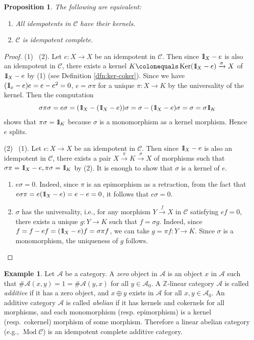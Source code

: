 \documentclass{surv-l}
\numberwithin{equation}{chapter}
\numberwithin{figure}{chapter}
\theoremstyle{plain}
\newtheorem{prp}[thm]{Proposition}
\theoremstyle{definition}
\newtheorem{exm}[thm]{Example}
\theoremstyle{remark}
\newcommand{\id}{1\kern-.25em{\text{{\rm l}}}}
\DeclareMathOperator{\Ker}{Ker}
\DeclareMathOperator{\Mod}{Mod}
\begin{document}
\begin{prp}\label{prp:idemp-compl-kernel}\label{prop:2.5.21}
The following are equivalent:
\begin{enumerate}
\item
All idempotents in ${\mathcal{C}}$ have their kernels.
\item
${\mathcal{C}}$ is idempotent complete.
\end{enumerate}
\end{prp}

\begin{proof}
(1) \text{$\Rightarrow$}\  (2).
Let $e \colon X \to X$ be an idempotent in ${\mathcal{C}}$.
Then since $\id_X - e$ is also an idempotent in ${\mathcal{C}}$,
there exists a kernel $K\colonequals  \Ker (\id_X - e) \xrightarrow{\sigma} X$ of $\id_X - e$
by (1) (see Definition \ref{dfn:ker-coker}).
Since we have
$(\id_x - e)e = e - e^2 = 0$,
$e = \sigma \pi$ for a unique $\pi \colon X \to K$
by the universality of the kernel.
Then the computation
\[
\sigma \pi \sigma = e \sigma = (\id_X - (\id_X-e))\sigma = \sigma - (\id_X- e)\sigma = \sigma = \sigma\id_K
\]
shows that $\pi \sigma = \id_K$ because $\sigma$ is a monomorphism as a kernel morphism.
Hence $e$ splits.

(2) \text{$\Rightarrow$}\  (1).
Let $e \colon X \to X$ be an idempotent in ${\mathcal{C}}$.
Then since $\id_X - e$ is also an idempotent in ${\mathcal{C}}$,
there exists a pair $X \xrightarrow{\pi} K \xrightarrow{\sigma} X$ of morphisms such that
$\sigma \pi = \id_X -e, \pi \sigma = \id_K$ by (2).
It is enough to show that $\sigma$ is a kernel of $e$.

\begin{enumerate}[wide, label=(\roman*)]
\item $e\sigma = 0$.
Indeed, since $\pi$ is an epimorphism as a retraction,
from the fact that $e\sigma\pi = e(\id_X - e) = e -e = 0$, it follows that
$e\sigma = 0$.
\item $\sigma$ has the universality, i.e., for any morphism $Y \xrightarrow{f} X$ in ${\mathcal{C}}$
satisfying $ef = 0$, there exists a unique $g \colon Y \to K$
such that $f = \sigma g$.
Indeed,
since $f = f - ef = (\id_X -e)f = \sigma\pi f$,
we can take $g = \pi f \colon Y \to K$.
Since $\sigma$ is a monomorphism,
the uniqueness of $g$ follows.
\end{enumerate}
\end{proof}

\begin{exm}
Let $\mathcal{A}$ be a category.
A \emph{zero} object in  $\mathcal{A}$ is an object $x$ in $\mathcal{A}$ such that
$\#\mathcal{A}(x,y) = 1= \#\mathcal{A}(y,x)$ for all $y \in \mathcal{A}_0$.
A $\mathbb{Z}$-linear category $\mathcal{A}$ is called \emph{additive} if it has a zero object, and
$x \oplus y$ exists in $\mathcal{A}$ for all $x, y \in \mathcal{A}_0$.
An additive category $\mathcal{A}$ is called \emph{abelian} if it has kernels and cokernels
for all morphisms, and each monomorphism (resp. epimorphism) is
a kernel (resp.\ cokernel) morphism of some morphism.
Therefore a linear abelian category (e.g., $\Mod {\mathcal{C}}$) is
an idempotent complete additive category.
\end{exm}
\end{document}
